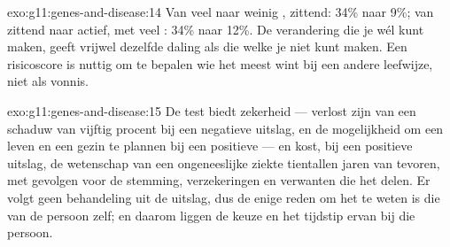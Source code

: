 \begin{solution}{exo:g11:genes-and-disease:14}
Van veel naar weinig , zittend: 34\% naar 9\%; van zittend naar
actief, met veel : 34\% naar 12\%. De verandering die je wél kunt
maken, geeft vrijwel dezelfde daling als die welke je niet kunt maken. Een
risicoscore is nuttig om te bepalen wie het meest wint bij een andere
leefwijze, niet als vonnis.
\end{solution}

\begin{solution}{exo:g11:genes-and-disease:15}
De test biedt zekerheid --- verlost zijn van een schaduw van vijftig
procent bij een negatieve uitslag, en de mogelijkheid om een leven en een
gezin te plannen bij een positieve --- en kost, bij een positieve
uitslag, de wetenschap van een ongeneeslijke ziekte tientallen jaren van
tevoren, met gevolgen voor de stemming, verzekeringen en verwanten die het
 delen. Er volgt geen behandeling uit de uitslag, dus de enige reden om
het te weten is die van de persoon zelf; en daarom liggen de keuze en het
tijdstip ervan bij die persoon.
\end{solution}

